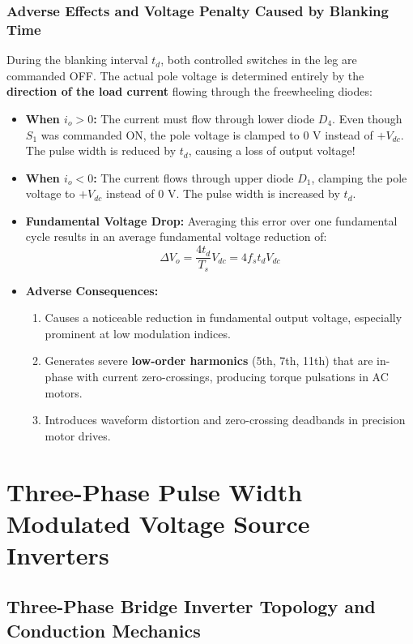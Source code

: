 \documentclass[11pt,a4paper]{article}
\begin{document}
\subsubsection{Adverse Effects and Voltage Penalty Caused by Blanking Time}
During the blanking interval $t_d$, both controlled switches in the leg are commanded OFF. The actual pole voltage is determined entirely by the \textbf{direction of the load current} flowing through the freewheeling diodes:
\begin{itemize}[leftmargin=*]
  \item \textbf{When $i_o > 0$:} The current must flow through lower diode $D_4$. Even though $S_1$ was commanded ON, the pole voltage is clamped to $0\text{ V}$ instead of $+V_{dc}$. The pulse width is reduced by $t_d$, causing a loss of output voltage!
  \item \textbf{When $i_o < 0$:} The current flows through upper diode $D_1$, clamping the pole voltage to $+V_{dc}$ instead of $0\text{ V}$. The pulse width is increased by $t_d$.
  \item \textbf{Fundamental Voltage Drop:} Averaging this error over one fundamental cycle results in an average fundamental voltage reduction of:
  \begin{equation}
  \Delta V_o = \frac{4 t_d}{T_s} V_{dc} = 4 f_s t_d V_{dc}
  \label{eq:deadtime_voltage_drop}
  \end{equation}
  \item \textbf{Adverse Consequences:}
  \begin{enumerate}
    \item Causes a noticeable reduction in fundamental output voltage, especially prominent at low modulation indices.
    \item Generates severe \textbf{low-order harmonics} (5th, 7th, 11th) that are in-phase with current zero-crossings, producing torque pulsations in AC motors.
    \item Introduces waveform distortion and zero-crossing deadbands in precision motor drives.
  \end{enumerate}
\end{itemize}


\section{Three-Phase Pulse Width Modulated Voltage Source Inverters}

\subsection{Three-Phase Bridge Inverter Topology and Conduction Mechanics}
\end{document}
